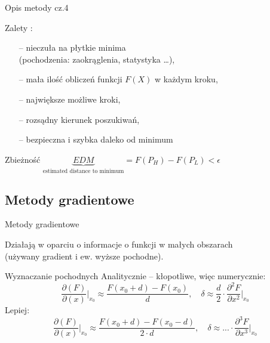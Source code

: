   \begin{frame}{Opis metody cz.4}

	\begin{block}{Zalety :}
	  	\begin{itemize}
	  		\item[--] nieczuła na płytkie minima
	  		\\(pochodzenia: zaokrąglenia, statystyka \ldots),
	  		\item[--] mała ilość obliczeń funkcji $F(X)$ w każdym kroku,
	  		\item[--] największe możliwe kroki,
	  		\item[--] rozsądny kierunek poszukiwań,
	  		\item[--] bezpieczna i szybka daleko od minimum
	  	\end{itemize}
    \end{block}
    \begin{block}{Zbieżność}
	  	$\underbrace{EDM}_{ \text{estimated distance to minimum}} = F(P_H) - F(P_L) < \epsilon$
    \end{block}

  \end{frame}

\subsection{Metody gradientowe}

  \begin{frame}{Metody gradientowe}

 	Działają w oparciu o informacje o funkcji w małych obszarach
 	\\(używany gradient i ew. wyższe pochodne).
    \begin{block}{Wyznaczanie pochodnych}
 	   Analitycznie -- kłopotliwe, więc numerycznie:
 	   \begin{displaymath}
 	   	  \frac{\partial (F)}{\partial (x)} \bigg\vert_{x_0} \approx \frac{F(x_0+d) - F(x_0)}{d},
 	   	  \quad \delta \approx \frac{d}{2} \cdot \frac{\partial^2 F}{\partial x^2} \bigg\vert_{x_0}
 	   \end{displaymath}
 	   Lepiej:
 	   \begin{displaymath}
 	   	  \frac{\partial (F)}{\partial (x)} \bigg\vert_{x_0} \approx \frac{F(x_0+d) - F(x_0-d)}{2\cdot d},
 	   	  \quad \delta \approx ... \cdot \frac{\partial^3 F}{\partial x^3} \bigg\vert_{x_0}
 	   \end{displaymath}
  	\end{block}

  \end{frame}

